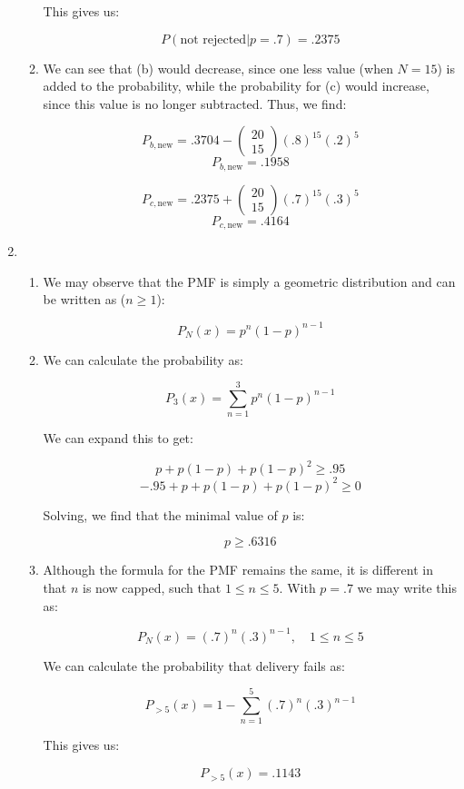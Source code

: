 \begin{enumerate}
\begin{enumerate}
        This gives us:

        $$\boxed{P(\text{not rejected}|p=.7)=.2375}$$

      \item We can see that (b) would decrease, since one less value (when $N=15$) is added to the probability, while the probability for (c) would increase, since this value is no longer subtracted. Thus, we find:

        $$P_{b,\text{new}}=.3704 - \left( \begin{matrix}20\\15\end{matrix} \right)(.8)^{15}(.2)^{5}$$
        $$\boxed{P_{b,\text{new}}=.1958}$$

        $$P_{c,\text{new}}=.2375 + \left( \begin{matrix}20\\15\end{matrix} \right)(.7)^{15}(.3)^{5}$$
        $$\boxed{P_{c,\text{new}}=.4164}$$

    \end{enumerate}

  \item

    \begin{enumerate}

      \item We may observe that the PMF is simply a geometric distribution and can be written as ($n\geq 1$):

        $$\boxed{P_N(x)=p^n(1-p)^{n-1}}$$

      \item We can calculate the probability as:

        $$P_3(x)=\sum_{n=1}^3 p^n(1-p)^{n-1}$$

        We can expand this to get:

        $$p+p(1-p)+p(1-p)^2\geq.95$$
        $$-.95+p+p(1-p)+p(1-p)^2\geq0$$

        Solving, we find that the minimal value of $p$ is:

        $$\boxed{p\geq .6316}$$

      \item Although the formula for the PMF remains the same, it is different in that $n$ is now capped, such that $1\leq n\leq 5$. With $p=.7$ we may write this as:

        $$\boxed{P_N(x)=(.7)^n(.3)^{n-1},\quad 1\leq n\leq 5}$$

        We can calculate the probability that delivery fails as:

        $$P_{>5}(x)=1-\sum_{n=1}^5 (.7)^n(.3)^{n-1}$$

        This gives us:

        $$\boxed{P_{>5}(x)=.1143}$$

    \end{enumerate}

\end{enumerate}



